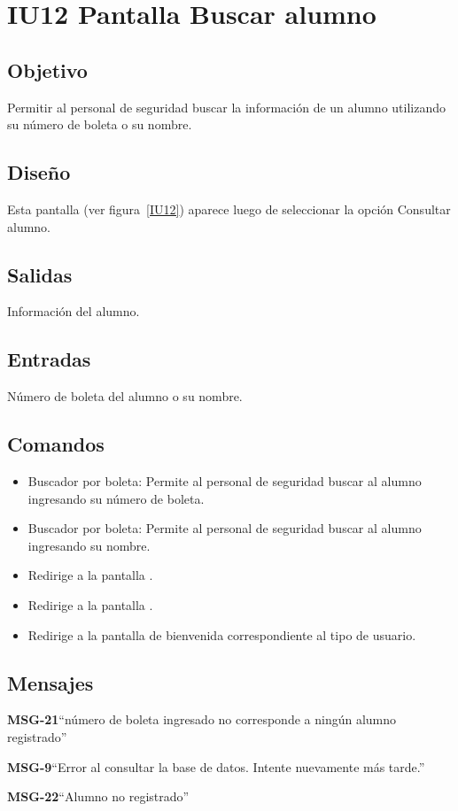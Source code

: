 \section{IU12 Pantalla Buscar alumno}

\subsection{Objetivo}
    Permitir al personal de seguridad buscar la información de un alumno utilizando su número de boleta o su nombre. 

\subsection{Diseño}
    Esta pantalla  (ver figura~\ref{IU12}) aparece luego de seleccionar la opción Consultar alumno. 


\subsection{Salidas}
    Información del alumno.

\subsection{Entradas}
    Número de boleta del alumno o su nombre. 

\subsection{Comandos}
\begin{itemize}
    \item Buscador por boleta: Permite al personal de seguridad buscar al alumno ingresando su número de boleta.
    \item Buscador por boleta: Permite al personal de seguridad buscar al alumno ingresando su nombre.
    \item {} Redirige a la pantalla .
    \item {} Redirige a la pantalla .
    \item {} Redirige a la pantalla de bienvenida correspondiente al tipo de usuario.
\end{itemize}

\subsection{Mensajes}

\begin{Citemize}
    \item {\bf MSG-21}{``número de boleta ingresado no corresponde a ningún alumno registrado''}
    \item {\bf MSG-9}{``Error al consultar la base de datos. Intente nuevamente más tarde.''}
    \item {\bf MSG-22}{``Alumno no registrado''}
\end{Citemize}


